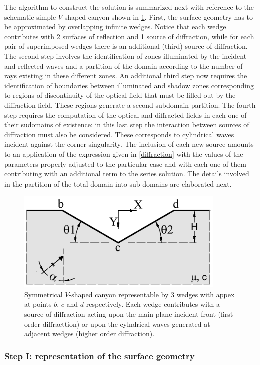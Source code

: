 \documentclass[11pt,letterpaper]{article}
\begin{document}
The algorithm to construct the solution is summarized next with reference to the schematic simple $V$-shaped canyon shown in \cref{fig:vshapedcanyon2}. First, the surface geometry has to be approximated by overlapping infinite wedges. Notice that each wedge contributes with 2 surfaces of reflection and 1 source of diffraction, while for each pair of superimposed wedges there is an additional (third) source of diffraction. The second step involves the identification of zones illuminated by the incident and reflected waves and a partition of the domain according to the number of rays existing in these different zones. An additional third step now requires the identification of boundaries between illuminated and shadow zones corresponding to regions of discontinuity of the optical field that must be filled out by the diffraction field. These regions generate a second subdomain partition. The fourth step requires the computation of the optical and diffracted fields in each one of their sudomains of existence: in this last step the interaction between sources of diffraction must also be considered. These corresponds to cylindrical waves incident against the corner singularity. The inclusion of each new source amounts to an application of the expression given in \cref{diffraction} with the values of the parameters properly adjusted to the particular case and with each one of them contributing with an additional term to the series solution. The details involved in the partition of the total domain into sub-domains are elaborated next.
%
\begin{figure}[H]
\centering
\includegraphics[width=10cm]{IMAGES/vshaped1.pdf}
\caption{Symmetrical $V$-shaped canyon representable by 3 wedges with appex at points $b$, $c$ and $d$ respectively. Each wedge contributes with a source of diffraction
 acting upon the main plane incident front (first order diffracttion) or upon the cylndrical waves generated at adjacent wedges (higher order diffraction).
\label{fig:vshapedcanyon2}}
\end{figure}
%
\subsubsection*{Step I: representation of the surface geometry}
\end{document}
